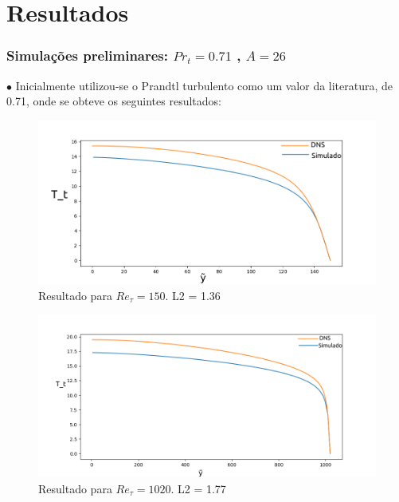\documentclass[xcolor=dvipsnames,10pt,aspectratio=169]{beamer}
\begin{document}
	\section{Resultados}
		\begin{frame}
			\frametitle{Simulações preliminares: $Pr_t= 0.71$ , $A = 26 $}
				$\bullet$ Inicialmente utilizou-se o Prandtl turbulento como um valor da literatura, de 0.71, onde se obteve os seguintes resultados:\\
			\begin{minipage}[h!]{0.45\textwidth}
			\begin{figure}
				\centering
				\includegraphics[angle=0, scale=0.28]{150orto}
				\caption{Resultado para $Re_\tau = 150$. L2 = 1.36 }
			\end{figure}
			\end{minipage}\hfill
				\begin{minipage}[h!]{0.45\textwidth}
				\begin{figure}
					\centering
					\includegraphics[angle=0, scale=0.28]{1020orto}
					\caption{Resultado para $Re_\tau = 1020$. L2 = 1.77}
				\end{figure}
			\end{minipage}		
		\end{frame}
	
\end{document}
